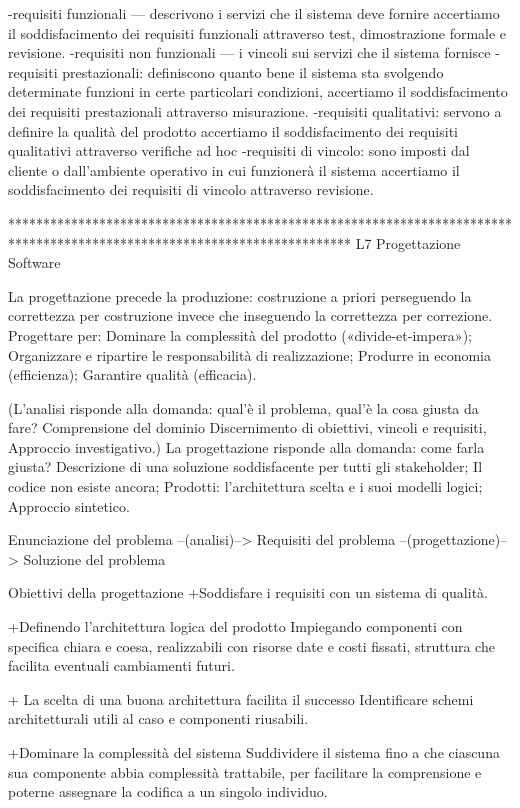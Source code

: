 \documentclass{report}
\begin{document}
-requisiti funzionali — descrivono i servizi che il sistema deve fornire 
accertiamo il soddisfacimento dei requisiti funzionali attraverso test, dimostrazione formale e revisione.
-requisiti non funzionali — i vincoli sui servizi che il sistema fornisce
-requisiti prestazionali: definiscono quanto bene il sistema sta svolgendo determinate funzioni in certe particolari condizioni,
accertiamo il soddisfacimento dei requisiti prestazionali attraverso misurazione.
-requisiti qualitativi: servono a definire la qualità del prodotto
accertiamo il soddisfacimento dei requisiti qualitativi attraverso verifiche ad hoc
-requisiti di vincolo: sono imposti dal cliente o dall’ambiente operativo in cui funzionerà il sistema
accertiamo il soddisfacimento dei requisiti di vincolo attraverso revisione.

*************************************************************************************************************************
L7 Progettazione Software

La progettazione precede la produzione: costruzione a priori perseguendo la correttezza per costruzione invece che inseguendo la correttezza per correzione.
Progettare per: Dominare la complessità del prodotto («divide-et-impera»); Organizzare e ripartire le responsabilità di realizzazione;
Produrre in economia (efficienza); Garantire qualità (efficacia).

(L’analisi risponde alla domanda: qual’è il problema, qual'è la cosa giusta da fare? Comprensione del dominio Discernimento di obiettivi, vincoli e requisiti, Approccio investigativo.)
La progettazione risponde alla domanda: come farla giusta? Descrizione di una soluzione soddisfacente per tutti gli stakeholder; Il codice non esiste ancora; Prodotti: l’architettura scelta e i suoi modelli logici; Approccio sintetico.

Enunciazione del problema --(analisi)--> Requisiti del problema --(progettazione)-->  Soluzione del problema

Obiettivi della progettazione
+Soddisfare i requisiti con un sistema di qualità.

+Definendo l’architettura logica del prodotto
Impiegando componenti con specifica chiara e coesa, realizzabili con risorse date e costi fissati, struttura che facilita eventuali cambiamenti futuri.

+ La scelta di una buona architettura facilita il successo
Identificare schemi architetturali utili al caso e componenti riusabili.

+Dominare la complessità del sistema
Suddividere il sistema fino a che ciascuna sua componente abbia complessità trattabile, per facilitare la comprensione e poterne assegnare la codifica a un singolo individuo.
\end{document}
